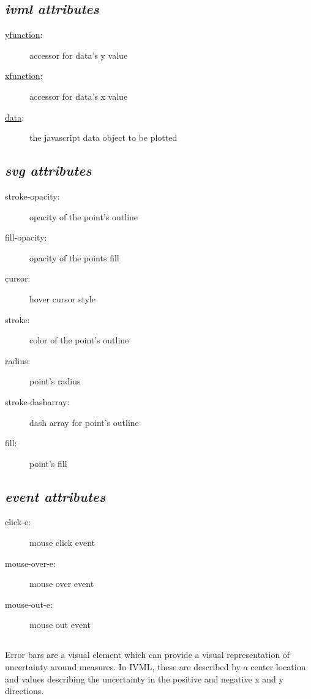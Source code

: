 \subsection*{\emph{ivml attributes}}
\begin{description}
\item[\uline{yfunction}:]{accessor for data's y value}
\item[\uline{xfunction}:]{accessor for data's x value}
\item[\uline{data}:]{the javascript data object to be plotted}
\end{description}
\subsection*{\emph{svg attributes}}
\begin{description}
\item[stroke-opacity:]{opacity of the point's outline}
\item[fill-opacity:]{opacity of the points fill}
\item[cursor:]{hover cursor style}
\item[stroke:]{color of the point's outline}
\item[radius:]{point's radius}
\item[stroke-dasharray:]{dash array for point's outline}
\item[fill:]{point's fill}
\end{description}
\subsection*{\emph{event attributes}}
\begin{description}
\item[click-e:]{mouse click event}
\item[mouse-over-e:]{mouse over event}
\item[mouse-out-e:]{mouse out event}
\end{description}
\clearpage \noindent \hrulefill
\subsection*{{\tt <error-bars>}}
\hrulefill\newline
 Error bars are a visual element which can provide a visual representation of uncertainty around measures. In IVML, these are described by a center location and values describing the uncertainty in the positive and negative x and y directions.
